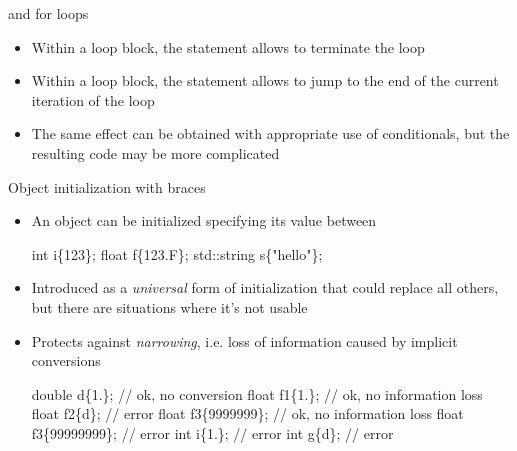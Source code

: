 \begin{frame}{ and  for loops}

  \begin{itemize}
  \item<1-> Within a loop block, the  statement allows to terminate
    the loop
  \item<2-> Within a loop block, the  statement allows to jump to
    the end of the current iteration of the loop
  \item<3> The same effect can be obtained with appropriate use of conditionals,
    but the resulting code may be more complicated
  \end{itemize}
\end{frame}

\begin{frame}[fragile]{Object initialization with braces}

  \begin{itemize}
  \item An object can be initialized specifying its value between \code{\{\}}

    \begin{codeblock}
int i\{123\};
float f\{123.F\};
std::string s\{"hello"\};\end{codeblock}

  \item Introduced as a \textit{universal} form of initialization that could
    replace all others, but there are situations where it's not usable

  \item Protects against \textit{narrowing}, i.e. loss of information caused by
    implicit conversions

    \begin{codeblock}
double d\{1.\};         // ok, no conversion
float f1\{1.\};         // ok, no information loss
float f2\{d\};          // error
float f3\{9\textquotesingle{}999\textquotesingle{}999\};  // ok, no information loss
float f3\{99\textquotesingle{}999\textquotesingle{}999\}; // error
int i\{1.\};            // error
int g\{d\};             // error\end{codeblock}
  \end{itemize}
\end{frame}

